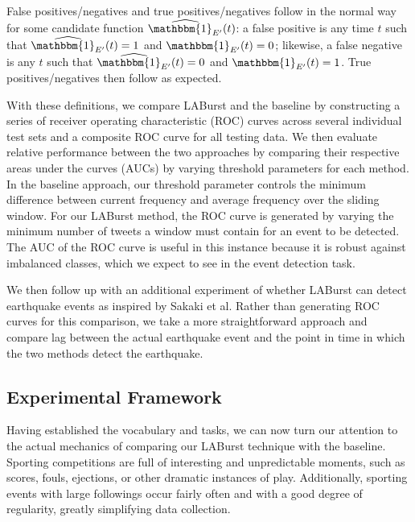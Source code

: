 \documentclass{sig-alternate}
\newcommand{\red}[1]{\textcolor{red}{#1}}
\begin{document}
False positives/negatives and true positives/negatives follow in the normal way for some candidate function $\widehat{\mathbbm{1}_{E'}}(t)$: a false positive is any time $t$ such that $\widehat{\mathbbm{1}_{E'}}(t) = 1$ and ${\mathbbm{1}_{E'}}(t) = 0$; likewise, a false negative is any $t$ such that $\widehat{\mathbbm{1}_{E'}}(t) = 0$ and ${\mathbbm{1}_{E'}}(t) = 1$.
True positives/negatives then follow as expected.

With these definitions, we compare LABurst and the baseline by constructing a series of receiver operating characteristic (ROC) curves across several individual test sets and a composite ROC curve for all testing data.
We then evaluate relative performance between the two approaches by comparing their respective areas under the curves (AUCs) by varying threshold parameters for each method.
In the baseline approach, our threshold parameter controls the minimum difference between current frequency and average frequency over the sliding window.
For our LABurst method, the ROC curve is generated by varying the minimum number of tweets a window must contain for an event to be detected.
The AUC of the ROC curve is useful in this instance because it is robust against imbalanced classes, which we expect to see in the event detection task.

We then follow up with an additional experiment of whether LABurst can detect earthquake events as inspired by Sakaki et al.
Rather than generating ROC curves for this comparison, we take a more straightforward approach and compare lag between the actual earthquake event and the point in time in which the two methods detect the earthquake.


\subsection{Experimental Framework}



Having established the vocabulary and tasks, we can now turn our attention to the actual mechanics of comparing our LABurst technique with the baseline.
Sporting competitions are full of interesting and unpredictable moments, such as scores, fouls, ejections, or other dramatic instances of play.
Additionally, sporting events with large followings occur fairly often and with a good degree of regularity, greatly simplifying data collection.
\end{document}
